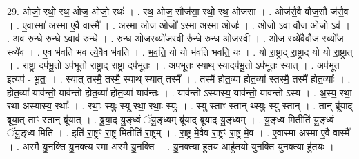 \documentclass[17pt]{extarticle}
\begin{document}
29. ओजो॒ रथो॒ रथ॒ ओज॒ ओजो॒ रथः॑ । . रथ॒ ओज॒ सौज॑सा॒ रथो॒ रथ॒ ओज॑सा । . ओज॑सै॒वै वौज॒सौ ज॑सै॒व । . ए॒वास्मा॑ अस्मा ए॒वै वास्मै᳚ । . अ॒स्मा॒ ओज॒ ओजो᳚ ऽस्मा अस्मा॒ ओजः॑ । . ओजो ऽवा वौज॒ ओजो ऽव॑ । . अव॑ रुन्धे रु॒न्धे ऽवाव॑ रुन्धे । . रु॒न्ध॒ ओ॒ज॒स्व्यो॑ज॒स्वी रु॑न्धे रुन्ध ओज॒स्वी । . ओ॒ज॒ स्व्ये॑वैवौज॒ स्व्यो॑ज॒ स्व्ये॑व । . ए॒व भ॑वति भव त्ये॒वैव भ॑वति । . भ॒व॒ति॒ यो यो भ॑वति भवति॒ यः । . यो रा॒ष्ट्राद् रा॒ष्ट्राद् यो यो रा॒ष्ट्रात् । . रा॒ष्ट्रा दप॑भू॒तो ऽप॑भूतो रा॒ष्ट्राद् रा॒ष्ट्रा दप॑भूतः । . अप॑भूतः॒ स्याथ् स्यादप॑भू॒तो ऽप॑भूतः॒ स्यात् । . अप॑भूत॒ इत्यप॑ - भू॒तः॒ । . स्यात् तस्मै॒ तस्मै॒ स्याथ् स्यात् तस्मै᳚ । . तस्मै॑ होत॒व्या॑ होत॒व्या᳚ स्तस्मै॒ तस्मै॑ होत॒व्याः᳚ । . हो॒त॒व्या॑ याव॑न्तो॒ याव॑न्तो होत॒व्या॑ होत॒व्या॑ याव॑न्तः । . याव॑न्तो ऽस्यास्य॒ याव॑न्तो॒ याव॑न्तो ऽस्य । . अ॒स्य॒ रथा॒ रथा॑ अस्यास्य॒ रथाः᳚ । . रथाः॒ स्युः स्यू रथा॒ रथाः॒ स्युः । . स्यु स्ताꣳ स्तान् थ्स्युः स्यु स्तान् । . तान् ब्रू॑याद् ब्रूया॒त् ताꣳ स्तान् ब्रू॑यात् । . ब्रू॒या॒द् यु॒ङ्ध्वं ॅयु॒ङ्ध्वम् ब्रू॑याद् ब्रूयाद् यु॒ङ्ध्वम् । . यु॒ङ्ध्व मितीति॑ यु॒ङ्ध्वं ॅयु॒ङ्ध्व मिति॑ । . इति॑ रा॒ष्ट्रꣳ रा॒ष्ट्र मितीति॑ रा॒ष्ट्रम् । . रा॒ष्ट्र मे॒वैव रा॒ष्ट्रꣳ रा॒ष्ट्र मे॒व । . ए॒वास्मा॑ अस्मा ए॒वै वास्मै᳚ । . अ॒स्मै॒ यु॒न॒क्ति॒ यु॒न॒क्त्य॒ स्मा॒ अ॒स्मै॒ यु॒न॒क्ति॒ । . यु॒न॒क्त्या हु॑तय॒ आहु॑तयो युनक्ति युन॒क्त्या हु॑तयः । \newline
\end{document}
